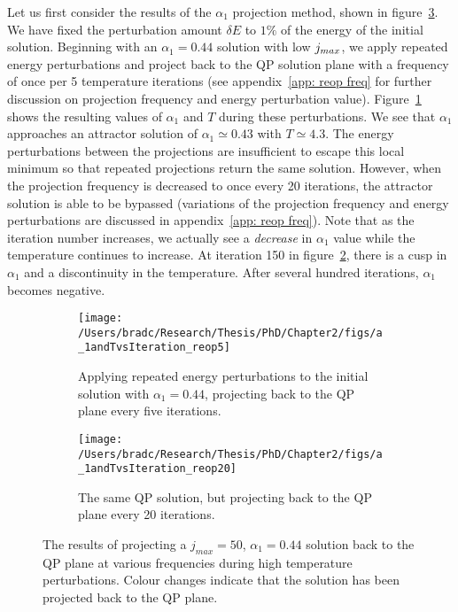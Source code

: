 \documentclass[../PhD.tex]{subfiles}
\begin{document}
Let us first consider the results of the $\alpha_1$ projection method, shown in figure~\ref{fig: reop comparisons}. We have fixed the perturbation amount $\delta E$ to $1\%$ of the energy of the initial solution. Beginning with an $\alpha_1 = 0.44$ solution with low $j_{max}$, we apply repeated energy perturbations and project back to the QP solution plane with a frequency of once per 5 temperature iterations (see appendix~\ref{app: reop freq} for further discussion  on projection frequency and energy perturbation value). Figure~\ref{fig: a_1andTa0.2reop5} shows the resulting values of $\alpha_1$ and $T$ during these perturbations. We see that $\alpha_1$ approaches an attractor solution of $\alpha_1 \simeq 0.43$ with $T \simeq 4.3$. The energy perturbations between the projections are insufficient to escape this local minimum so that repeated projections return the same solution. However, when the projection frequency is decreased to once every 20 iterations, the attractor solution is able to be bypassed (variations of the projection frequency and energy perturbations are discussed in appendix~\ref{app: reop freq}). Note that as the iteration number increases, we actually see a \emph{decrease} in $\alpha_1$ value while the temperature continues to increase. At iteration 150 in figure~\ref{fig: a_1andTa.2reop20}, there is a cusp in $\alpha_1$ and a discontinuity in the temperature. After several hundred iterations, $\alpha_1$ becomes negative.

\begin{figure}[ht]
	\centering
	\begin{subfigure}[t]{0.47\textwidth}
		\texttt{[image: /Users/bradc/Research/Thesis/PhD/Chapter2/figs/a\_1andTvsIteration\_reop5]}
		\caption{Applying repeated energy perturbations to the initial solution with $\alpha_1=0.44$, projecting back to the QP plane every five iterations.}
		\label{fig: a_1andTa0.2reop5}
	\end{subfigure}
	\hfill
	\begin{subfigure}[t]{0.47\textwidth}
		\texttt{[image: /Users/bradc/Research/Thesis/PhD/Chapter2/figs/a\_1andTvsIteration\_reop20]}
		\caption{The same QP solution, but projecting back to the QP plane every 20 iterations.}
		\label{fig: a_1andTa.2reop20}
	\end{subfigure}
	\caption[High temperature solutions resulting from projecting back to the QP solution plane at various frequencies]{The results of projecting a $j_{max}=50$, $\alpha_1 = 0.44$ solution back to the QP plane at various frequencies during high temperature perturbations. Colour changes indicate that the solution has been projected back to the QP plane.}
	\label{fig: reop comparisons}
\end{figure}
\end{document}
